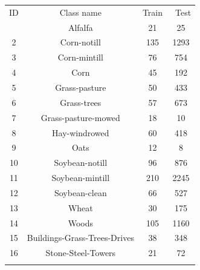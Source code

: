 \documentclass{ws-ijwmip}
\begin{document}
\begin{table}[ht]

{\begin{tabular}{@{}cccc@{}} \toprule
ID & Class name & Train &
\ Test \\
  \colrule
1 & Alfalfa & 21 & 25 \\
         2 & Corn-notill	& 135 & 1293 \\
         3 & Corn-mintill	& 76 & 754 \\
         4 & Corn & 45 & 192 \\
         5 & Grass-pasture	 & 50 & 433 \\
         6 & Grass-trees	 & 57 & 673 \\
         7 & Grass-pasture-mowed	 & 18 & 10 \\
         8 & Hay-windrowed	 & 60 & 418 \\
         9 & Oats	 & 12 & 8 \\
         10 & Soybean-notill & 96 & 876 \\
         11 & Soybean-mintill & 210 & 2245 \\
         12 & Soybean-clean	 & 66 & 527 \\
         13 & Wheat	 & 30 & 175 \\
         14 & Woods	 & 105 & 1160 \\
         15 & Buildings-Grass-Trees-Drives	 & 38 & 348 \\
         16 & Stone-Steel-Towers& 21 & 72 \\ \botrule
\end{tabular}}
\label{table1}
\end{table}







%
\end{document}
